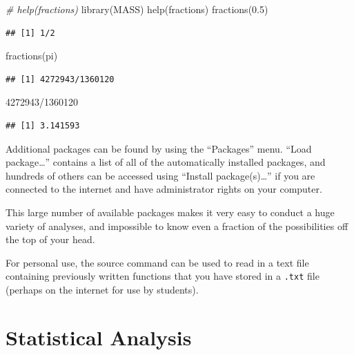 \documentclass[
]{book}
\newenvironment{Shaded}{\begin{snugshade}}{\end{snugshade}}
\newcommand{\CommentTok}[1]{\textcolor[rgb]{0.56,0.35,0.01}{\textit{#1}}}
\newcommand{\DecValTok}[1]{\textcolor[rgb]{0.00,0.00,0.81}{#1}}
\newcommand{\FloatTok}[1]{\textcolor[rgb]{0.00,0.00,0.81}{#1}}
\newcommand{\FunctionTok}[1]{\textcolor[rgb]{0.00,0.00,0.00}{#1}}
\newcommand{\NormalTok}[1]{#1}
\newcommand{\SpecialCharTok}[1]{\textcolor[rgb]{0.00,0.00,0.00}{#1}}
\begin{document}
\begin{Shaded}
\begin{Highlighting}[]
\CommentTok{\# help(fractions)}
\FunctionTok{library}\NormalTok{(MASS)}
\FunctionTok{help}\NormalTok{(fractions)}
\FunctionTok{fractions}\NormalTok{(}\FloatTok{0.5}\NormalTok{)}
\end{Highlighting}
\end{Shaded}

\begin{verbatim}
## [1] 1/2
\end{verbatim}

\begin{Shaded}
\begin{Highlighting}[]
\FunctionTok{fractions}\NormalTok{(pi)}
\end{Highlighting}
\end{Shaded}

\begin{verbatim}
## [1] 4272943/1360120
\end{verbatim}

\begin{Shaded}
\begin{Highlighting}[]
\DecValTok{4272943}\SpecialCharTok{/}\DecValTok{1360120}
\end{Highlighting}
\end{Shaded}

\begin{verbatim}
## [1] 3.141593
\end{verbatim}

Additional packages can be found by using the ``Packages'' menu. ``Load package\ldots{}'' contains a list of all of the automatically installed packages, and hundreds of others can be accessed using ``Install package(s)\ldots{}'' if you are connected to the internet and have administrator rights on your computer.

This large number of available packages makes it very easy to conduct a huge variety of analyses, and impossible to know even a fraction of the possibilities off the top of your head.

For personal use, the source command can be used to read in a text file containing previously written functions that you have stored in a \texttt{.txt} file (perhaps on the internet for use by students).

\hypertarget{statistical-analysis}{%
\chapter{Statistical Analysis}\label{statistical-analysis}}
\end{document}

